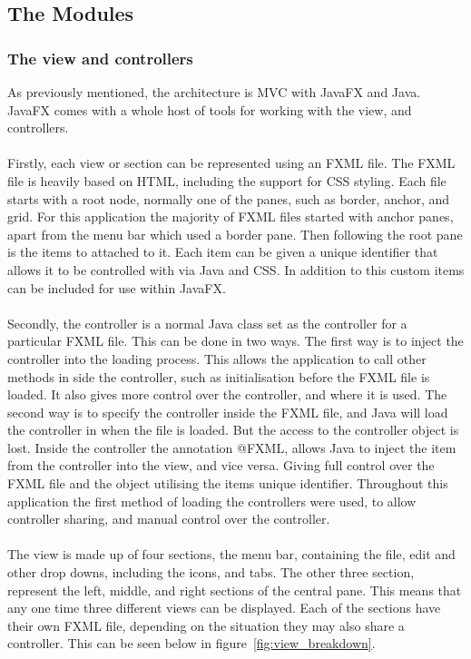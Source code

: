\subsection{The Modules}
\label{subsec:the_modules}

\subsubsection{The view and controllers}
\label{subsubsec:imp_veiw}

As previously mentioned, the architecture is MVC with JavaFX and Java. JavaFX comes with a whole host of tools for working with the view, and controllers. 
\\\\
Firstly, each view or section can be represented using an FXML file. The FXML file is heavily based on HTML, including the support for CSS styling. Each file starts with a root node, normally one of the panes, such as border, anchor, and grid. For this application the majority of FXML files started with anchor panes, apart from the menu bar which used a border pane. Then following the root pane is the items to attached to it. Each item can be given a unique identifier that allows it to be controlled with via Java and CSS. In addition to this custom items can be included for use within JavaFX.
\\\\
Secondly, the controller is a normal Java class set as the controller for a particular FXML file. This can be done in two ways. The first way is to inject the controller into the loading process. This allows the application to call other methods in side the controller, such as initialisation before the FXML file is loaded. It also gives more control over the controller, and where it is used. The second way is to specify the controller inside the FXML file, and Java will load the controller in when the file is loaded. But the access to the controller object is lost. Inside the controller the annotation @FXML, allows Java to inject the item from the controller into the view, and vice versa. Giving full control over the FXML file and the object utilising the items unique identifier. Throughout this application  the first method of loading the controllers were used, to allow controller sharing, and manual control over the controller. 
\\\\
The view is made up of four sections, the menu bar, containing the file, edit and other drop downs, including the icons, and tabs. The other three section, represent the left, middle, and right sections of the central pane. This means that any one time three different views can be displayed. Each of the sections have their own FXML file, depending on the situation they may also share a controller. This can be seen below in figure~\ref{fig:view_breakdown}.

